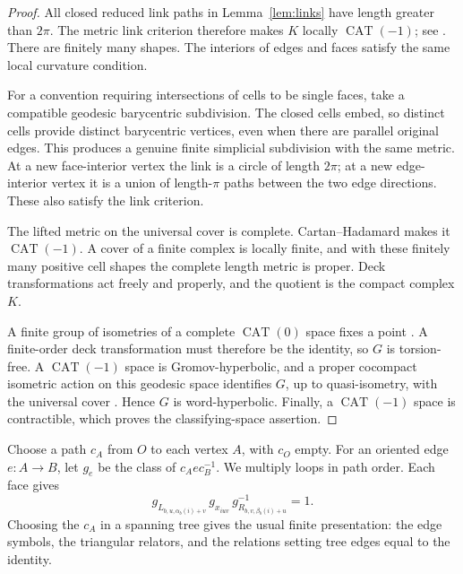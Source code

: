 \documentclass[11pt]{amsart}
\theoremstyle{definition}
\theoremstyle{remark}
\numberwithin{equation}{section}
\newcommand{\CAT}{\operatorname{CAT}}
\begin{document}
\begin{proof}
All closed reduced link paths in Lemma~\ref{lem:links} have length
greater than $2\pi$. The metric link criterion therefore makes
$K$ locally $\CAT(-1)$; see
\cite[Theorem~II.5.2 and Lemma~II.5.6]{BH}.
There are finitely many shapes. The interiors of edges and faces
satisfy the same local curvature condition.

For a convention requiring intersections of cells to be single
faces, take a compatible geodesic barycentric subdivision. The
closed cells embed, so distinct cells provide distinct barycentric
vertices, even when there are parallel original edges. This produces
a genuine finite simplicial subdivision with the same metric. At a
new face-interior vertex the link is a circle of length $2\pi$;
at a new edge-interior vertex it is a union of length-$\pi$ paths
between the two edge directions. These also satisfy the link
criterion.

The lifted metric on the universal cover is complete. Cartan--Hadamard
\cite[Theorem~II.4.1]{BH} makes it $\CAT(-1)$. A cover of a finite
complex is locally finite, and with these finitely many positive
cell shapes the complete length metric is proper. Deck
transformations act freely and properly, and the quotient is the
compact complex $K$.

A finite group of isometries of a complete $\CAT(0)$ space fixes a
point \cite[Corollary~II.2.8]{BH}. A finite-order deck transformation
must therefore be the identity, so $G$ is torsion-free. A $\CAT(-1)$
space is Gromov-hyperbolic, and a proper cocompact isometric action
on this geodesic space identifies $G$, up to quasi-isometry, with
the universal cover \cite[Chapters~I.8 and~III.H]{BH}. Hence $G$
is word-hyperbolic. Finally, a $\CAT(-1)$ space is contractible,
which proves the classifying-space assertion.
\end{proof}

Choose a path $c_A$ from $O$ to each vertex $A$, with $c_O$ empty.
For an oriented edge $e:A\to B$, let $g_e$ be the class of
$c_A e c_B^{-1}$. We multiply loops in path order. Each face gives
\begin{equation}\label{eq:group-triangle}
 g_{L_{b,u,\alpha_b(i)+v}}\,g_{x_{iuv}}\,
                   g_{R_{b,v,\beta_b(i)+u}}^{-1}=1.
\end{equation}
Choosing the $c_A$ in a spanning tree gives the usual finite
presentation: the edge symbols, the triangular relators, and the
relations setting tree edges equal to the identity.
\end{document}
